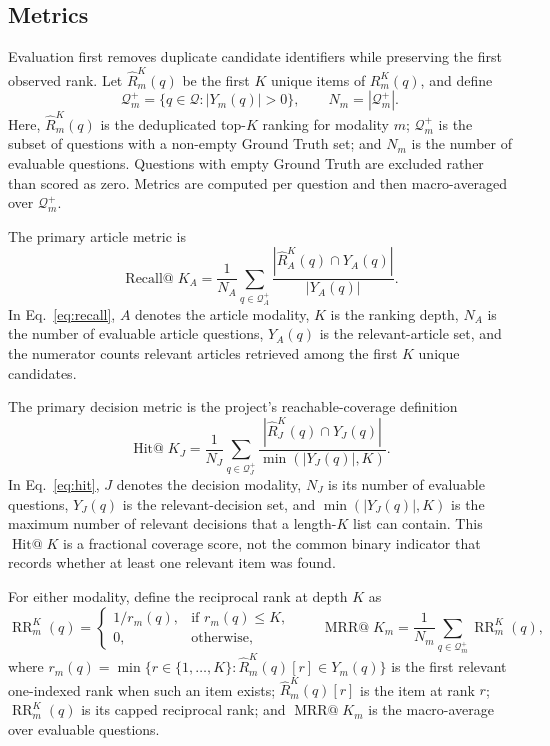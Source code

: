 \documentclass[runningheads]{llncs}
\begin{document}
\subsection{Metrics}

Evaluation first removes duplicate candidate identifiers while preserving the first observed rank. Let \(\widehat{R}_m^K(q)\) be the first \(K\) unique items of \(R_m^K(q)\), and define
\begin{equation}
  \mathcal{Q}_m^+=\{q\in\mathcal{Q}:|Y_m(q)|>0\},
  \qquad N_m=|\mathcal{Q}_m^+|.
  \label{eq:evaluable-questions}
\end{equation}
Here, \(\widehat{R}_m^K(q)\) is the deduplicated top-\(K\) ranking for modality \(m\); \(\mathcal{Q}_m^+\) is the subset of questions with a non-empty Ground Truth set; and \(N_m\) is the number of evaluable questions. Questions with empty Ground Truth are excluded rather than scored as zero. Metrics are computed per question and then macro-averaged over \(\mathcal{Q}_m^+\).

The primary article metric is
\begin{equation}
  \operatorname{Recall@}K_A=
  \frac{1}{N_A}\sum_{q\in\mathcal{Q}_A^+}
  \frac{|\widehat{R}_A^K(q)\cap Y_A(q)|}{|Y_A(q)|}.
  \label{eq:recall}
\end{equation}
In Eq.~\eqref{eq:recall}, \(A\) denotes the article modality, \(K\) is the ranking depth, \(N_A\) is the number of evaluable article questions, \(Y_A(q)\) is the relevant-article set, and the numerator counts relevant articles retrieved among the first \(K\) unique candidates.

The primary decision metric is the project's reachable-coverage definition
\begin{equation}
  \operatorname{Hit@}K_J=
  \frac{1}{N_J}\sum_{q\in\mathcal{Q}_J^+}
  \frac{|\widehat{R}_J^K(q)\cap Y_J(q)|}
       {\min(|Y_J(q)|,K)}.
  \label{eq:hit}
\end{equation}
In Eq.~\eqref{eq:hit}, \(J\) denotes the decision modality, \(N_J\) is its number of evaluable questions, \(Y_J(q)\) is the relevant-decision set, and \(\min(|Y_J(q)|,K)\) is the maximum number of relevant decisions that a length-\(K\) list can contain. This \(\operatorname{Hit@}K\) is a fractional coverage score, not the common binary indicator that records whether at least one relevant item was found.

For either modality, define the reciprocal rank at depth \(K\) as
\begin{equation}
  \operatorname{RR}_m^K(q)=
  \begin{cases}
    1/r_m(q), & \text{if }r_m(q)\leq K,\\
    0, & \text{otherwise},
  \end{cases}
  \qquad
  \operatorname{MRR@}K_m=
  \frac{1}{N_m}\sum_{q\in\mathcal{Q}_m^+}\operatorname{RR}_m^K(q),
  \label{eq:mrr}
\end{equation}
where \(r_m(q)=\min\{r\in\{1,\ldots,K\}:\widehat{R}_m^K(q)[r]\in Y_m(q)\}\) is the first relevant one-indexed rank when such an item exists; \(\widehat{R}_m^K(q)[r]\) is the item at rank \(r\); \(\operatorname{RR}_m^K(q)\) is its capped reciprocal rank; and \(\operatorname{MRR@}K_m\) is the macro-average over evaluable questions.
\end{document}
